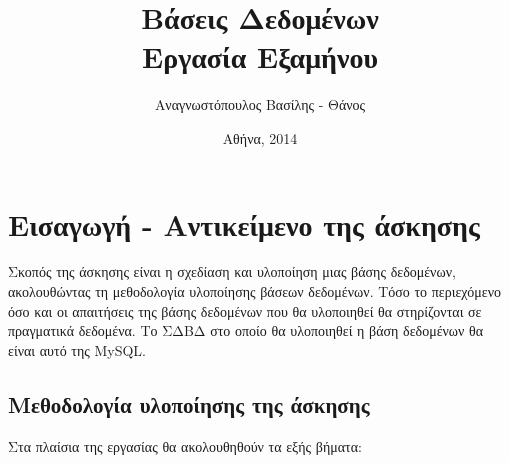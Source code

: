 \documentclass{assignment}
\title{Βάσεις Δεδομένων \\ Εργασία Εξαμήνου}
\date{Αθήνα, 2014}
\author{Αναγνωστόπουλος Βασίλης - Θάνος}
\begin{document}
\maketitle

\setcounter{page}{1} 

\pagestyle{plain}
\tableofcontents
\newpage


\setcounter{page}{1} 

\section{Εισαγωγή - Αντικείμενο της άσκησης}

Σκοπός της άσκησης είναι η σχεδίαση και υλοποίηση μιας βάσης δεδομένων,
ακολουθώντας τη μεθοδολογία υλοποίησης βάσεων δεδομένων. Τόσο το περιεχόμενο όσο και οι απαιτήσεις της βάσης δεδομένων που θα
υλοποιηθεί θα στηρίζονται σε πραγματικά δεδομένα. Το ΣΔΒΔ στο οποίο θα υλοποιηθεί η βάση δεδομένων θα είναι αυτό της MySQL.

\subsection{Μεθοδολογία υλοποίησης της άσκησης}

Στα πλαίσια της εργασίας θα ακολουθηθούν τα εξής βήματα:
\end{document}
